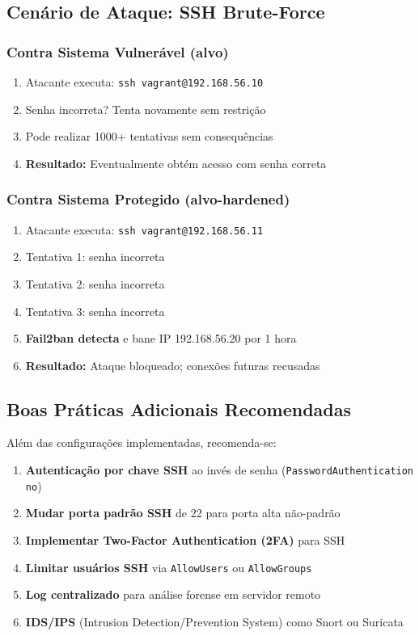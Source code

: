 \documentclass[12pt]{article}
\begin{document}
\subsection{Cenário de Ataque: SSH Brute-Force}

\subsubsection{Contra Sistema Vulnerável (alvo)}
\begin{enumerate}
    \item Atacante executa: \texttt{ssh vagrant@192.168.56.10}
    \item Senha incorreta? Tenta novamente sem restrição
    \item Pode realizar 1000+ tentativas sem consequências
    \item \textbf{Resultado:} Eventualmente obtém acesso com senha correta
\end{enumerate}

\subsubsection{Contra Sistema Protegido (alvo-hardened)}
\begin{enumerate}
    \item Atacante executa: \texttt{ssh vagrant@192.168.56.11}
    \item Tentativa 1: senha incorreta
    \item Tentativa 2: senha incorreta
    \item Tentativa 3: senha incorreta
    \item \textbf{Fail2ban detecta} e bane IP 192.168.56.20 por 1 hora
    \item \textbf{Resultado:} Ataque bloqueado; conexões futuras recusadas
\end{enumerate}

\subsection{Boas Práticas Adicionais Recomendadas}

Além das configurações implementadas, recomenda-se:
\begin{enumerate}
    \item \textbf{Autenticação por chave SSH} ao invés de senha (\texttt{PasswordAuthentication no})
    \item \textbf{Mudar porta padrão SSH} de 22 para porta alta não-padrão
    \item \textbf{Implementar Two-Factor Authentication (2FA)} para SSH
    \item \textbf{Limitar usuários SSH} via \texttt{AllowUsers} ou \texttt{AllowGroups}
    \item \textbf{Log centralizado} para análise forense em servidor remoto
    \item \textbf{IDS/IPS} (Intrusion Detection/Prevention System) como Snort ou Suricata
\end{enumerate}
\end{document}
